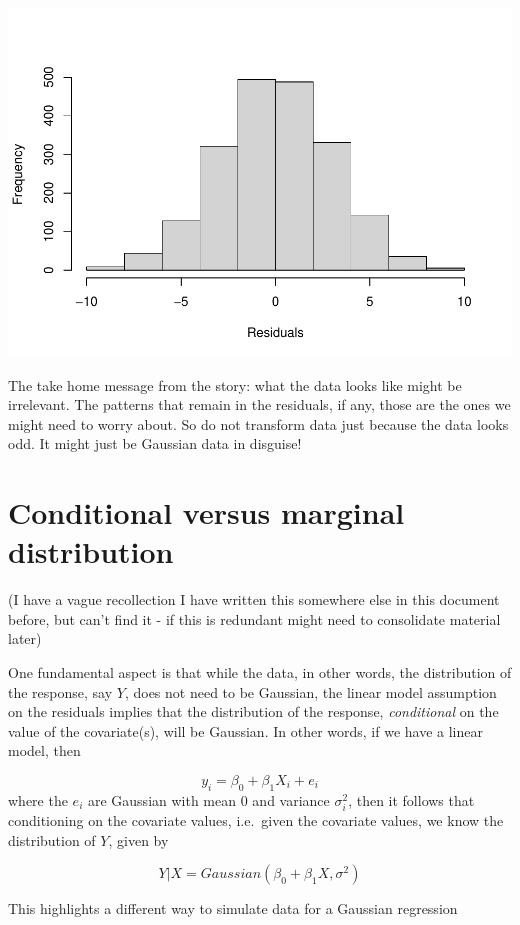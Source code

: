 \documentclass[
]{book}
\begin{document}
\includegraphics{ECOMODbook_files/figure-latex/reg12-1.pdf}

The take home message from the story: what the data looks like might be irrelevant. The patterns that remain in the residuals, if any, those are the ones we might need to worry about. So do not transform data just because the data looks odd. It might just be Gaussian data in disguise!

\section{Conditional versus marginal distribution}\label{conditional-versus-marginal-distribution}

(I have a vague recollection I have written this somewhere else in this document before, but can't find it - if this is redundant might need to consolidate material later)

One fundamental aspect is that while the data, in other words, the distribution of the response, say \(Y\), does not need to be Gaussian, the linear model assumption on the residuals implies that the distribution of the response, \emph{conditional} on the value of the covariate(s), will be Gaussian. In other words, if we have a linear model, then

\[ y_i=\beta_0+\beta_1 X_i+e_i\]
where the \(e_i\) are Gaussian with mean 0 and variance \(\sigma^2_i\), then it follows that conditioning on the covariate values, i.e.~given the covariate values, we know the distribution of \(Y\), given by

\[Y|X=Gaussian(\beta_0+\beta_1 X,\sigma^2)\]

This highlights a different way to simulate data for a Gaussian regression
\end{document}
